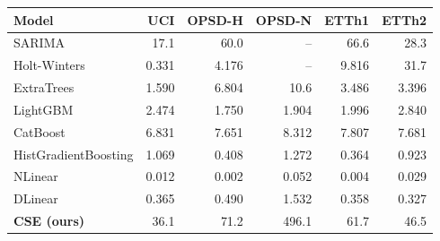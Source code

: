 \begin{tabular}{lrrrrr}
\toprule
Model & UCI & OPSD-H & OPSD-N & ETTh1 & ETTh2 \\
\midrule
SARIMA & 17.1 & 60.0 & -- & 66.6 & 28.3 \\
Holt-Winters & 0.331 & 4.176 & -- & 9.816 & 31.7 \\
ExtraTrees & 1.590 & 6.804 & 10.6 & 3.486 & 3.396 \\
LightGBM & 2.474 & 1.750 & 1.904 & 1.996 & 2.840 \\
CatBoost & 6.831 & 7.651 & 8.312 & 7.807 & 7.681 \\
HistGradientBoosting & 1.069 & 0.408 & 1.272 & 0.364 & 0.923 \\
NLinear & 0.012 & 0.002 & 0.052 & 0.004 & 0.029 \\
DLinear & 0.365 & 0.490 & 1.532 & 0.358 & 0.327 \\
\textbf{CSE (ours)} & 36.1 & 71.2 & 496.1 & 61.7 & 46.5 \\
\bottomrule
\end{tabular}
